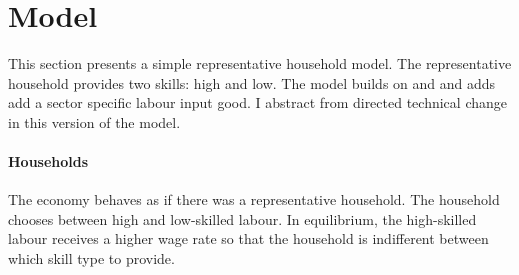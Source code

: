 \section{Model}
This section presents a simple representative household model. The representative household provides two skills: high and low. 
The model builds on \cite{Acemoglu2012TheChange} and \cite{Heathcote2017OptimalFramework} and adds add a sector specific labour input good. I abstract from directed technical change in this version of the model.

\paragraph{Households}
The economy behaves as if there was a representative household. The household chooses between high and low-skilled labour.  In equilibrium, the high-skilled labour receives a higher wage rate so that the household is indifferent between which skill type to provide.

